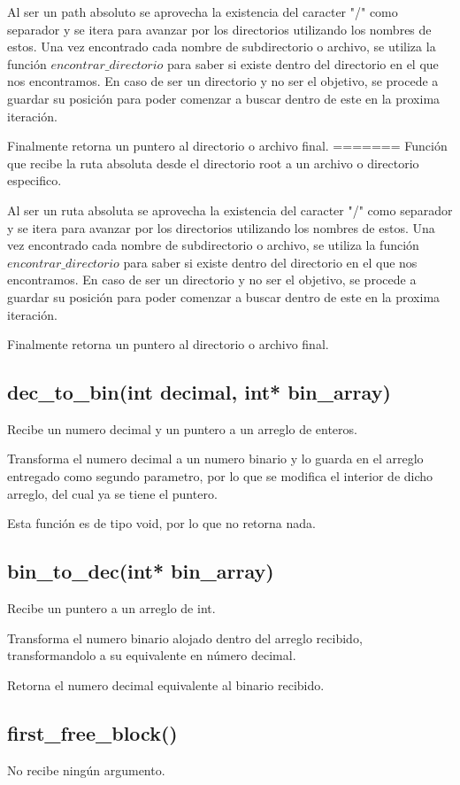 \documentclass[12pt]{article}
\begin{document}
Al ser un path absoluto se aprovecha la existencia del caracter "/" como separador y se itera para avanzar por los directorios utilizando los nombres de estos. Una vez encontrado cada nombre de subdirectorio o archivo, se utiliza la función $encontrar\_directorio$ para saber si existe dentro del directorio en el que nos encontramos. En caso de ser un directorio y no ser el objetivo, se procede a guardar su posición para poder comenzar a buscar dentro de este en la proxima iteración. 

Finalmente retorna un puntero al directorio o archivo final.
=======
Función que recibe la ruta absoluta desde el directorio root a un archivo o directorio especifico.

Al ser un ruta absoluta se aprovecha la existencia del caracter "/" como separador y se itera para avanzar por los directorios utilizando los nombres de estos. Una vez encontrado cada nombre de subdirectorio o archivo, se utiliza la función $encontrar\_directorio$ para saber si existe dentro del directorio en el que nos encontramos. En caso de ser un directorio y no ser el objetivo, se procede a guardar su posición para poder comenzar a buscar dentro de este en la proxima iteración. 

Finalmente retorna un puntero al directorio o archivo final.

\subsection{dec\_to\_bin(int decimal, int* bin\_array)}
Recibe un numero decimal y un puntero a un arreglo de enteros.

Transforma el numero decimal a un numero binario y lo guarda en el arreglo entregado como segundo parametro, por lo que se modifica el interior de dicho arreglo, del cual ya se tiene el puntero.

Esta función es de tipo void, por lo que no retorna nada.

\subsection{bin\_to\_dec(int* bin\_array)}
Recibe un puntero a un arreglo de int.

Transforma el numero binario alojado dentro del arreglo recibido, transformandolo a su equivalente en número decimal.

Retorna el numero decimal equivalente al binario recibido.

\subsection{first\_free\_block()}
No recibe ningún argumento.
\end{document}
